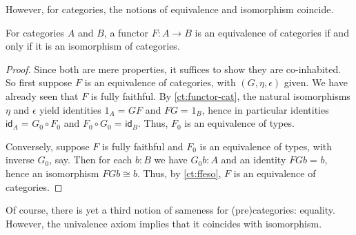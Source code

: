 \documentclass{mscs}
\newcommand{\id}[3][]{\ensuremath{#2 =_{#1} #3}\xspace}
\newcommand{\idfunc}[1][]{\ensuremath{\mathsf{id}_{#1}}\xspace}
\numberwithin{equation}{section}
\begin{document}
However, for categories, the notions of equivalence and isomorphism coincide.

\begin{lem}\label{ct:eqv-levelwise}
  For categories $A$ and $B$, a functor $F:A\to B$ is an equivalence of categories if and only if it is an isomorphism of categories.
\end{lem}
\begin{proof}
  Since both are mere properties, it suffices to show they are co-inhabited.
  So first suppose $F$ is an equivalence of categories, with $(G,\eta,\epsilon)$ given.
  We have already seen that $F$ is fully faithful.
  By \autoref{ct:functor-cat}, the natural isomorphisms $\eta$ and $\epsilon$ yield identities $\id{1_A}{GF}$ and $\id{FG}{1_B}$, hence in particular identities $\id{\idfunc[A]}{G_0\circ F_0}$ and $\id{F_0\circ G_0}{\idfunc[B]}$.
Thus, $F_0$ is an equivalence of types.

  Conversely, suppose $F$ is fully faithful and $F_0$ is an equivalence of types, with inverse $G_0$, say.
  Then for each $b:B$ we have $G_0 b:A$ and an identity $\id{FGb}{b}$, hence an isomorphism $FGb\cong b$.
  Thus, by \autoref{ct:ffeso}, $F$ is an equivalence of categories.
\end{proof}

Of course, there is yet a third notion of sameness for (pre)categories: equality.
However, the univalence axiom implies that it coincides with isomorphism.
\end{document}
